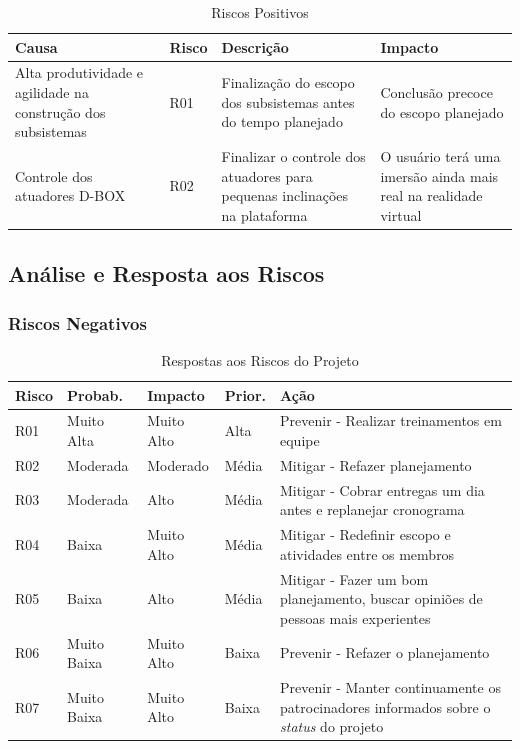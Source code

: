 \begin{table}[H]
\centering
\caption{Riscos Positivos}
\label{riscos-positivos}
\begin{tabular}{|p{4.5cm}|l|p{5cm}|p{4.5cm}|}
\hline 
\textbf{Causa} & \textbf{Risco} & \textbf{Descrição} & \textbf{Impacto} \\ \hline
Alta produtividade e agilidade na construção dos subsistemas & R01 & Finalização do escopo dos subsistemas antes do tempo planejado &
Conclusão precoce do escopo planejado \\
Controle dos atuadores D-BOX
 & R02 & Finalizar o controle dos atuadores para pequenas inclinações na plataforma & O usuário terá uma imersão ainda mais real na realidade virtual \\
\hline
\end{tabular}
\end{table}

\subsection{Análise e Resposta aos Riscos}

\subsubsection{Riscos Negativos}

\begin{table}[H]
\centering
\caption{Respostas aos Riscos do Projeto}
\label{respostas-3}
\begin{tabular}{|l|l|l|l|p{9cm}|}
\hline
Risco & Probab.    & Impacto    & Prior. & Ação      \\
\hline
R01 & Muito Alta & Muito Alto & Alta & Prevenir - Realizar treinamentos em equipe \\
R02 & Moderada & Moderado & Média & Mitigar - Refazer planejamento \\
R03 & Moderada & Alto & Média & Mitigar - Cobrar entregas um dia antes e replanejar cronograma \\
R04 & Baixa & Muito Alto & Média & Mitigar - Redefinir escopo e atividades entre os membros \\
R05 & Baixa & Alto & Média & Mitigar - Fazer um bom planejamento, buscar opiniões de pessoas mais experientes \\
R06 & Muito Baixa & Muito Alto & Baixa & Prevenir - Refazer o planejamento \\
R07 & Muito Baixa & Muito Alto & Baixa & Prevenir - Manter continuamente os patrocinadores informados sobre o \textit{status} do projeto \\
\hline
\end{tabular}
\end{table}


